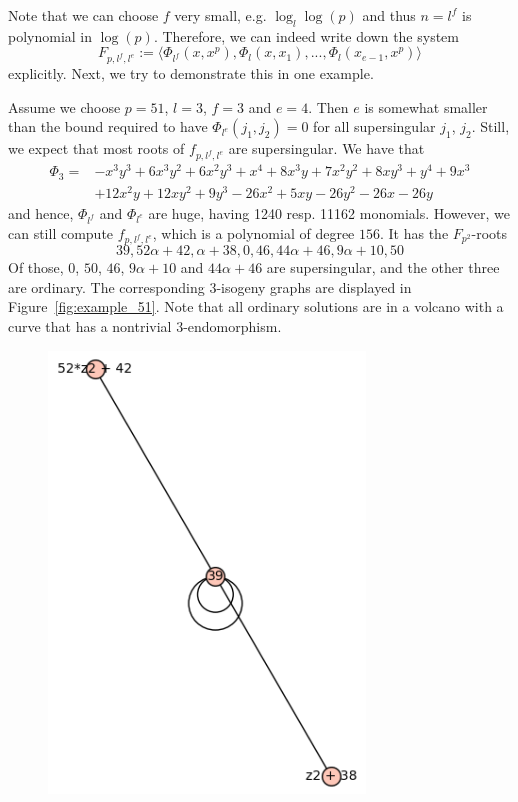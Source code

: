 Note that we can choose $f$ very small, e.g. $\log_l\log(p)$ and thus $n = l^f$ is polynomial in $\log(p)$.
Therefore, we can indeed write down the system
\begin{equation*}
    F_{p, l^f, l^e} := \langle \Phi_{l^f}(x, x^p), \Phi_l(x, x_1), ..., \Phi_l(x_{e - 1}, x^p) \rangle
\end{equation*}
explicitly.
Next, we try to demonstrate this in one example.
\begin{example}
    Assume we choose $p = 51$, $l = 3$, $f = 3$ and $e = 4$.
    Then $e$ is somewhat smaller than the bound required to have $\Phi_{l^e}(j_1, j_2) = 0$ for all supersingular $j_1$, $j_2$.
    Still, we expect that most roots of $f_{p, l^f, l^e}$ are supersingular.
    We have that
    \begin{align*}
        \Phi_3 =& -x^3y^3 + 6x^3y^2 + 6x^2y^3 + x^4 + 8x^3y + 7x^2y^2 + 8xy^3 + y^4 + 9x^3 \\
        &+ 12x^2y + 12xy^2 + 9y^3 - 26x^2 + 5xy - 26y^2 - 26x - 26y
    \end{align*}
    and hence, $\Phi_{l^f}$ and $\Phi_{l^e}$ are huge, having 1240 resp. 11162 monomials.
    However, we can still compute $f_{p, l^f, l^e}$, which is a polynomial of degree $156$.
    It has the $F_{p^2}$-roots
    \begin{equation*}
        39, 52\alpha + 42, \alpha + 38, 0, 46, 44\alpha + 46, 9\alpha + 10, 50
    \end{equation*}
    Of those, $0$, $50$, $46$, $9\alpha + 10$ and $44\alpha + 46$ are supersingular, and the other three are ordinary.
    The corresponding $3$-isogeny graphs are displayed in Figure~\ref{fig:example_51}.
    Note that all ordinary solutions are in a volcano with a curve that has a nontrivial $3$-endomorphism.
    \begin{figure}
        \begin{minipage}{0.5\textwidth}
            \centering
            \includegraphics[width = 0.75\textwidth]{../example_51_ordinary.png}

\end{minipage}
\end{figure}
\end{example}
